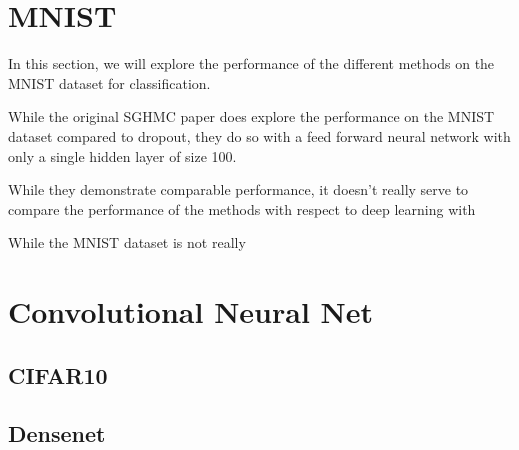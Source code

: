 \section{MNIST}
In this section, we will explore the performance of the different methods on the MNIST dataset for classification.

While the original SGHMC paper does explore the performance on the MNIST dataset compared to dropout, they do so with a feed forward neural network with only a single hidden layer of size 100.


While they demonstrate comparable performance, it doesn't really serve to compare the performance of the methods with respect to deep learning with  

While the MNIST dataset is not really 


\section{Convolutional Neural Net}

\subsection{CIFAR10}

\subsection{Densenet}


